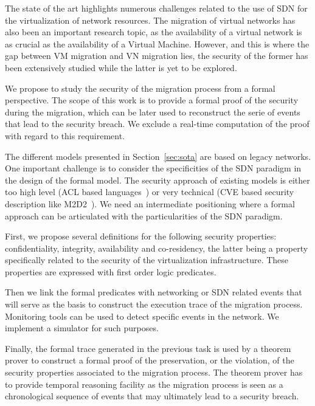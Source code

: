 The state of the art highlights numerous challenges related to the use of SDN for the virtualization of network resources.
The migration of virtual networks has also been an important research topic, as the availability of a virtual network is as crucial as the availability of a Virtual Machine.
However, and this is where the gap between VM migration and VN migration lies, the security of the former has been extensively studied while the latter is yet to be explored.

We propose to study the security of the migration process from a formal perspective.
The scope of this work is to provide a formal proof of the security during the migration, which can be later used to reconstruct the serie of events that lead to the security breach. We exclude a real-time computation of the proof with regard to this requirement.

The different models presented in Section~\ref{sec:sota} are based on legacy networks.
One important challenge is to consider the specificities of the SDN paradigm in the design of the formal model.
The security approach of existing models is either too high level (ACL based languages~\cite{orbac,mulval-Ou2013}) or very technical (CVE based security description like M2D2~\cite{M2D2-Morin2002}).
We need an intermediate positioning where a formal approach can be articulated with the particularities of the SDN paradigm.

First, we propose several definitions for the following security properties: confidentiality, integrity, availability 
and co-residency, the latter being a property specifically related to the security of the virtualization infrastructure.
These properties are expressed with first order logic predicates.

Then we link the formal predicates with networking or SDN related events that will serve as the basis to construct the execution trace of the migration process.
Monitoring tools can be used to detect specific events in the network. 
We implement a simulator for such purposes.

Finally, the formal trace generated in the previous task is used by a theorem prover to construct a formal proof of the preservation, or the violation, of the security properties associated to the migration process. The theorem prover has to provide temporal reasoning facility as the migration process is seen as a chronological sequence of events that may ultimately lead to a security breach.
